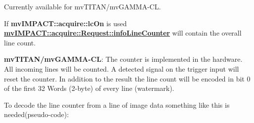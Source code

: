 Currently available for mv\+T\+I\+T\+A\+N/mv\+G\+A\+M\+M\+A-\/\+C\+L. 

If {\bfseries mv\+I\+M\+P\+A\+C\+T\+::acquire\+::lc\+On} is used {\bfseries \hyperlink{classmv_i_m_p_a_c_t_1_1acquire_1_1_request_a22b3b014b6d006099e6bd2db72ca65fe}{mv\+I\+M\+P\+A\+C\+T\+::acquire\+::\+Request\+::info\+Line\+Counter}} will contain the overall line count.

{\bfseries mv\+T\+I\+T\+A\+N/mv\+G\+A\+M\+M\+A-\/\+C\+L}\+: The counter is implemented in the hardware. All incoming lines will be counted. A detected signal on the trigger input will reset the counter. In addition to the result the line count will be encoded in bit 0 of the first 32 Words (2-\/byte) of every line (watermark).

To decode the line counter from a line of image data something like this is needed(pseudo-\/code)\+:


